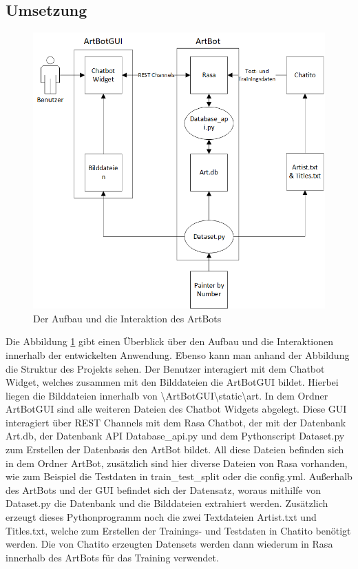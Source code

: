 \subsection{Umsetzung}\label{umsetzung}

\begin{figure}[H]
	\centerline{\includegraphics[width=0.8\linewidth]{figures/implementierung.png}}
	\caption{Der Aufbau und die Interaktion des ArtBots}
	\label{img:implemenatation}
\end{figure}

Die Abbildung \ref{img:implemenatation} gibt einen Überblick über den Aufbau und die Interaktionen innerhalb der entwickelten Anwendung. Ebenso kann man anhand der Abbildung die Struktur des Projekts sehen. Der Benutzer interagiert mit dem Chatbot Widget, welches zusammen mit den Bilddateien die ArtBotGUI bildet. Hierbei liegen die Bilddateien innerhalb von \textbackslash ArtBotGUI\textbackslash static\textbackslash art. In dem Ordner ArtBotGUI sind alle weiteren Dateien des Chatbot Widgets abgelegt. Diese GUI interagiert über REST Channels mit dem Rasa Chatbot, der mit der Datenbank Art.db, der Datenbank API Database\_api.py und dem Pythonscript Dataset.py zum Erstellen der Datenbasis den ArtBot bildet. All diese Dateien befinden sich in dem Ordner ArtBot, zusätzlich sind hier diverse Dateien von Rasa vorhanden, wie zum Beispiel die Testdaten in train\_test\_split oder die config.yml. Außerhalb des ArtBots und der GUI befindet sich der Datensatz, woraus mithilfe von Dataset.py die Datenbank und die Bilddateien extrahiert werden. Zusätzlich erzeugt dieses Pythonprogramm noch die zwei Textdateien Artist.txt und Titles.txt, welche zum Erstellen der Trainings- und Testdaten in Chatito benötigt werden. Die von Chatito erzeugten Datensets werden dann wiederum in Rasa innerhalb des ArtBots für das Training verwendet. 